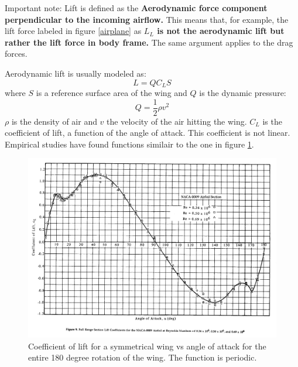 Important note: Lift is defined as the \textbf{Aerodynamic force component perpendicular to the incoming airflow.} This means that, for example, the lift force labeled in figure \ref {airplane} as \textbf{$L_L$ is not the aerodynamic lift but rather the lift force in body frame.} The same argument applies to the drag forces.

Aerodynamic lift is usually modeled as:
\begin{equation}
    L = Q  C_L S
\end{equation}
where $S$ is a reference surface area of the wing and $Q$ is the dynamic pressure:
\begin{equation}
    Q = \frac{1}{2} \rho v^2
\end{equation}
$\rho$ is the density of air and $v$ the velocity of the air hitting the wing.
$C_L$ is the coefficient of lift, a function of the angle of attack.
This coefficient is not linear. Empirical studies have found functions similair to the one in figure \ref{clalpha}.
\begin{figure}[h]
    \center
    \includegraphics[scale=0.15]{aoa_80s.png}
    \caption{Coefficient of lift for a symmetrical wing vs angle of attack for the entire 180 degree rotation of the wing. The function is periodic.}
    \label{clalpha}
\end{figure}

